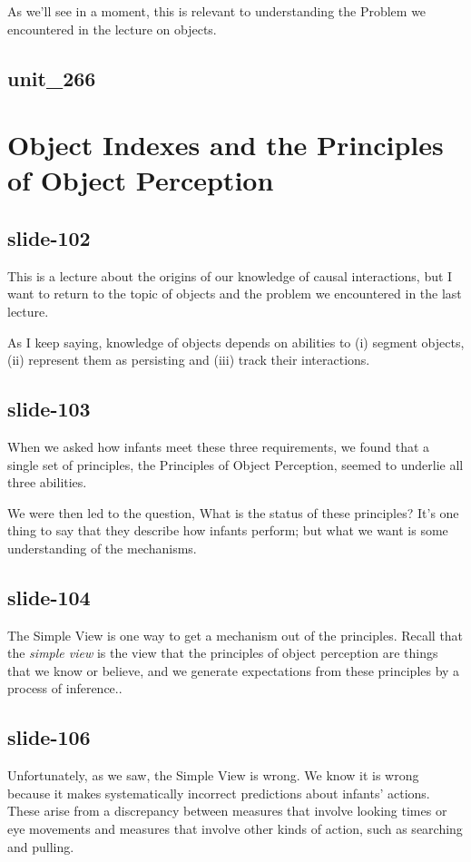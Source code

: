 \documentclass[12pt,\papersize]{extarticle}
\begin{document}
As we'll see in a moment, this is relevant to understanding the Problem we encountered 
in the lecture on objects.
 
\subsection{unit\_266}
 
 
\section{Object Indexes and the Principles of Object Perception}
 
\subsection{slide-102}
This is a lecture about the origins of our knowledge of causal interactions, but I want to 
return to the topic of objects and the problem we encountered in the last lecture.
 
As I keep saying, knowledge of objects depends on abilities to (i) segment objects, 
(ii) represent them as persisting and (iii) track their interactions.
 
\subsection{slide-103}
When we asked how infants meet these three requirements, we found that a single set of principles,
the Principles of Object Perception, seemed to underlie all three abilities.
 
We were then led to the question, What is the status of these principles?
It's one thing to say that they describe how infants perform; but what we want is some
understanding of the mechanisms.
 
\subsection{slide-104}
The Simple View is one way to get a mechanism out of the principles.
Recall that the \emph{simple view} is the view that the principles of object perception are things that we know or believe, and we generate expectations from these principles by a process of inference..
 
\subsection{slide-106}
Unfortunately, as we saw, the Simple View is wrong.
We know it is wrong because it makes systematically incorrect predictions about infants' actions.
These arise from a discrepancy between measures that involve looking times or eye movements
and measures that involve 
other kinds of action, such as searching and pulling.
 
\end{document}

